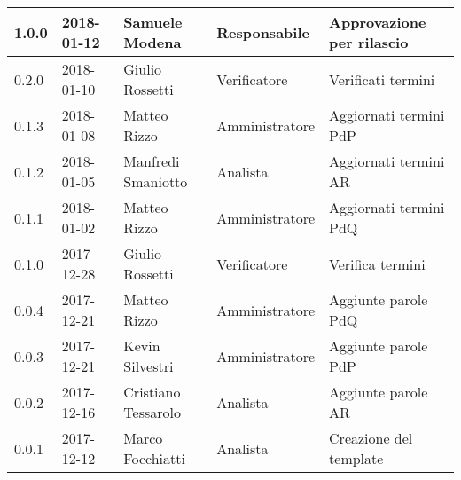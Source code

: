 \documentclass[./AnalisideiRequisiti.tex]{subfiles}
\begin{document}
{\begin{longtable}{|p{20mm}|p{20mm}|p{40mm}|p{30mm}|p{50mm}|}
		1.0.0 & 2018-01-12 & Samuele Modena & Responsabile & Approvazione per rilascio\\ \hline
		0.2.0 & 2018-01-10 & Giulio Rossetti & Verificatore & Verificati termini\\ \hline
		0.1.3 & 2018-01-08 & Matteo Rizzo & Amministratore & Aggiornati termini PdP\\ \hline
		0.1.2 & 2018-01-05 & Manfredi Smaniotto & Analista & Aggiornati termini AR \\ \hline		
		0.1.1 & 2018-01-02 & Matteo Rizzo & Amministratore & Aggiornati termini PdQ\\ \hline	
	   	0.1.0 & 2017-12-28 & Giulio Rossetti & Verificatore & Verifica termini\\ \hline		
		0.0.4 & 2017-12-21 & Matteo Rizzo & Amministratore & Aggiunte parole PdQ \\ \hline
		0.0.3 & 2017-12-21 & Kevin Silvestri & Amministratore & Aggiunte parole PdP \\ \hline
		0.0.2 & 2017-12-16 & Cristiano Tessarolo & Analista & Aggiunte parole AR\\ \hline
		0.0.1 & 2017-12-12 & Marco Focchiatti & Analista & Creazione del template\\ \hline
	\end{longtable}

}	
\end{document}
